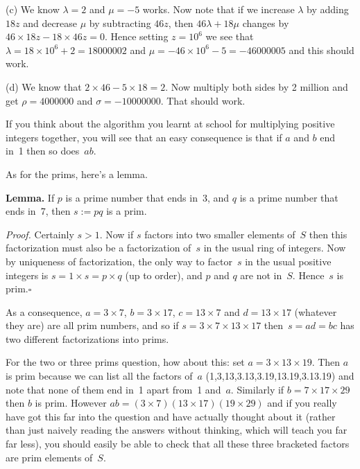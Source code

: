 \documentclass[10pt]{article}
\begin{document}
(c) We know $\lambda=2$ and $\mu=-5$ works. Now note that if we increase $\lambda$ by adding $18z$ and decrease $\mu$ by subtracting $46z$, then $46\lambda+18\mu$ changes by $46\times 18z-18\times 46z=0$. Hence setting $z=10^6$ we see that $\lambda=18\times 10^6+2=18000002$ and $\mu=-46\times 10^6-5=-46000005$ and this should work.

(d) We know that $2\times 46-5\times 18=2$. Now multiply both sides by 2 million and get $\rho=4000000$ and $\sigma=-10000000$. That should work.

\medskip{} 

If you think about the algorithm you learnt at school for multiplying positive integers together, you will see that an easy consequence is that if $a$ and $b$ end in~1 then so does~$ab$.

As for the prims, here's a lemma.

{\bf Lemma.} If $p$ is a prime number that ends in~3, and $q$ is a prime number that ends in~7, then $s:=pq$ is a prim.

{\it Proof.} Certainly $s>1$. Now if $s$ factors into two smaller elements of~$S$ then this factorization must also be a factorization of~$s$ in the usual ring of integers. Now by uniqueness of factorization, the only way to factor~$s$ in the usual positive integers is $s=1\times s=p\times q$ (up to order), and $p$ and $q$ are not in~$S$. Hence~$s$ is prim.$\square$

As a consequence, $a=3\times 7$, $b=3\times 17$, $c=13\times 7$ and $d=13\times 17$ (whatever they are) are all prim numbers, and so if $s=3\times 7\times 13\times 17$ then~$s=ad=bc$ has two different factorizations into prims.

For the two or three prims question, how about this: set $a=3\times 13\times 19$. Then $a$ is prim because we can list all the factors of~$a$ (1,3,13,3.13,3.19,13.19,3.13.19) and note that none of them end in~1 apart from~1 and~$a$. Similarly if $b=7\times 17\times 29$ then $b$ is prim. However $ab=(3\times 7)(13\times 17)(19\times 29)$ and if you really have got this far into the question and have actually thought about it (rather than just naively reading the answers without thinking, which will teach you far far less), you should easily be able to check that all these three bracketed factors are prim elements of~$S$.
\end{document}
